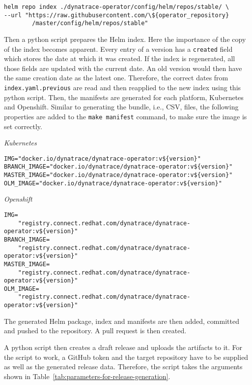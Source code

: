\begin{verbatim}
helm repo index ./dynatrace-operator/config/helm/repos/stable/ \
--url "https://raw.githubusercontent.com/\${operator_repository}
        /master/config/helm/repos/stable"
\end{verbatim}

Then a python script prepares the Helm index.
Here the importance of the copy of the index becomes apparent.
Every entry of a version has a \verb|created| field which stores the date at which it was created.
If the index is regenerated, all those fields are updated with the current date.
An old version would then have the same creation date as the latest one.
Therefore, the correct dates from \verb|index.yaml.previous| are read and then reapplied to the new index using this python script.
Then, the manifests are generated for each platform, Kubernetes and Openshift.
Similar to generating the bundle, i.e., CSV, files, the following properties are added to the \verb|make manifest| command, to make sure the image is set correctly.

\textit{Kubernetes}

\begin{verbatim}
IMG="docker.io/dynatrace/dynatrace-operator:v${version}"
BRANCH_IMAGE="docker.io/dynatrace/dynatrace-operator:v${version}"
MASTER_IMAGE="docker.io/dynatrace/dynatrace-operator:v${version}"
OLM_IMAGE="docker.io/dynatrace/dynatrace-operator:v${version}"
\end{verbatim}

\textit{Openshift}

\begin{verbatim}
IMG=
    "registry.connect.redhat.com/dynatrace/dynatrace-operator:v${version}"
BRANCH_IMAGE=
    "registry.connect.redhat.com/dynatrace/dynatrace-operator:v${version}"
MASTER_IMAGE=
    "registry.connect.redhat.com/dynatrace/dynatrace-operator:v${version}"
OLM_IMAGE=
    "registry.connect.redhat.com/dynatrace/dynatrace-operator:v${version}"
\end{verbatim}

The generated Helm package, index and manifests are then added, committed and pushed to the repository.
A pull request is then created.

A python script then creates a draft release and uploads the artifacts to it.
For the script to work, a GitHub token and the target repository have to be supplied as well as the generated release data.
Therefore, the script takes the arguments shown in Table~\ref{tab:parameters-for-release-generation}.

